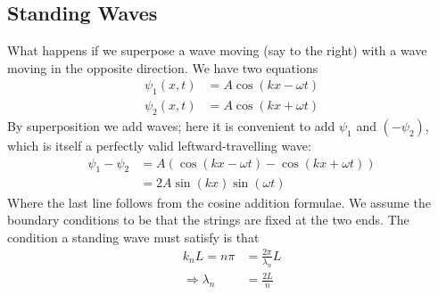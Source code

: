 \documentclass{report}
\numberwithin{equation}{section}
\begin{document}
\subsection{Standing Waves}
What happens if we superpose a wave moving (say to the right) with a wave moving in the opposite direction. We have two equations
\begin{align*}
	\psi_1(x,t) &= A\cos(kx-\omega t)\\
	\psi_2(x,t) &= A\cos(kx+\omega t)
\end{align*}
By superposition we add waves; here it is convenient to add $\psi_1$ and $(-\psi_2)$, which is itself a perfectly valid leftward-travelling wave:
\begin{align*}
	\psi_1-\psi_2 &= A\left(\cos(kx-\omega t) - \cos(kx+\omega t)\right)\\
	 &= 2A\sin(kx)\sin(\omega t)
\end{align*}
Where the last line follows from the cosine addition formulae. We assume the boundary conditions to be that the strings are fixed at the two ends. The condition a standing wave must satisfy is that
\begin{align}
	k_nL = n\pi &= \frac{2\pi}{\lambda_n}L\\
	\Rightarrow \lambda_n &= \frac{2L}{n}
\end{align}
\end{document}
